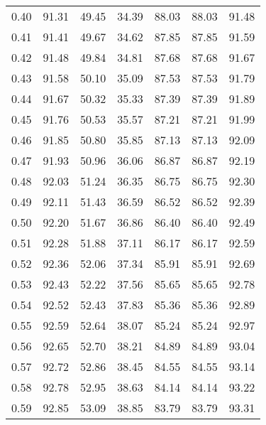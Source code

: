 \begin{tabular}{|c|c|c|c|c|c|c|}
      0.40 &     91.31 &     49.45 &      34.39 &   88.03 &      88.03 &         91.48 \\
      0.41 &     91.41 &     49.67 &      34.62 &   87.85 &      87.85 &         91.59 \\
      0.42 &     91.48 &     49.84 &      34.81 &   87.68 &      87.68 &         91.67 \\
      0.43 &     91.58 &     50.10 &      35.09 &   87.53 &      87.53 &         91.79 \\
      0.44 &     91.67 &     50.32 &      35.33 &   87.39 &      87.39 &         91.89 \\
      0.45 &     91.76 &     50.53 &      35.57 &   87.21 &      87.21 &         91.99 \\
      0.46 &     91.85 &     50.80 &      35.85 &   87.13 &      87.13 &         92.09 \\
      0.47 &     91.93 &     50.96 &      36.06 &   86.87 &      86.87 &         92.19 \\
      0.48 &     92.03 &     51.24 &      36.35 &   86.75 &      86.75 &         92.30 \\
      0.49 &     92.11 &     51.43 &      36.59 &   86.52 &      86.52 &         92.39 \\
      0.50 &     92.20 &     51.67 &      36.86 &   86.40 &      86.40 &         92.49 \\
      0.51 &     92.28 &     51.88 &      37.11 &   86.17 &      86.17 &         92.59 \\
      0.52 &     92.36 &     52.06 &      37.34 &   85.91 &      85.91 &         92.69 \\
      0.53 &     92.43 &     52.22 &      37.56 &   85.65 &      85.65 &         92.78 \\
      0.54 &     92.52 &     52.43 &      37.83 &   85.36 &      85.36 &         92.89 \\
      0.55 &     92.59 &     52.64 &      38.07 &   85.24 &      85.24 &         92.97 \\
      0.56 &     92.65 &     52.70 &      38.21 &   84.89 &      84.89 &         93.04 \\
      0.57 &     92.72 &     52.86 &      38.45 &   84.55 &      84.55 &         93.14 \\
      0.58 &     92.78 &     52.95 &      38.63 &   84.14 &      84.14 &         93.22 \\
      0.59 &     92.85 &     53.09 &      38.85 &   83.79 &      83.79 &         93.31 \\

\end{tabular}
